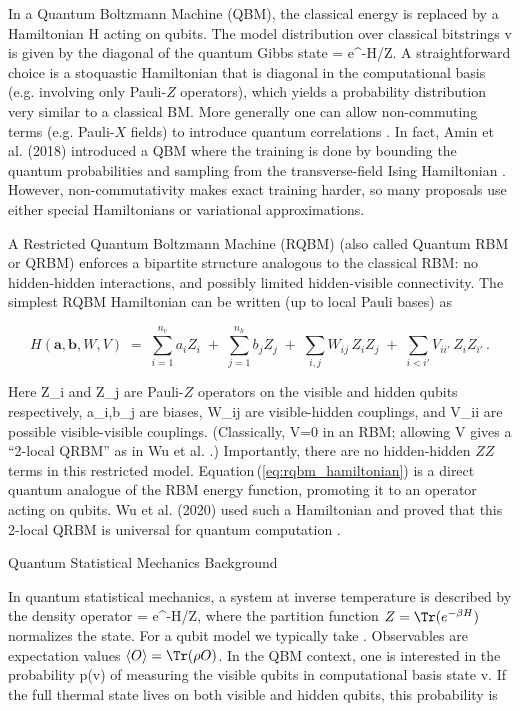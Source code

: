 In a Quantum Boltzmann Machine (QBM), the classical energy is replaced by a Hamiltonian H acting on qubits.  The model distribution over classical bitstrings v is given by the diagonal of the quantum Gibbs state \rho = e^{-H}/Z.  A straightforward choice is a stoquastic Hamiltonian that is diagonal in the computational basis (e.g. involving only Pauli-$Z$ operators), which yields a probability distribution very similar to a classical BM.  More generally one can allow non-commuting terms (e.g. Pauli-$X$ fields) to introduce quantum correlations .  In fact, Amin et al. (2018) introduced a QBM where the training is done by bounding the quantum probabilities and sampling from the transverse-field Ising Hamiltonian .  However, non-commutativity makes exact training harder, so many proposals use either special Hamiltonians or variational approximations.



A Restricted Quantum Boltzmann Machine (RQBM) (also called Quantum RBM or QRBM) enforces a bipartite structure analogous to the classical RBM: no hidden-hidden interactions, and possibly limited hidden-visible connectivity.  The simplest RQBM Hamiltonian can be written (up to local Pauli bases) as

\[

\label{eq:rqbm_hamiltonian}

H(\mathbf{a},\mathbf{b},W,V) \;=\; \sum_{i=1}^{n_v} a_i Z_i \;+\; \sum_{j=1}^{n_h} b_j Z_j \;+\; \sum_{i,j} W_{ij}\, Z_i Z_j \;+\; \sum_{i<i{\prime}} V_{ii{\prime}}\, Z_i Z_{i{\prime}} \,.

\]

Here Z_i and Z_j are Pauli-$Z$ operators on the visible and hidden qubits respectively, a_i,b_j are biases, W_{ij} are visible-hidden couplings, and V_{ii{\prime}} are possible visible-visible couplings.  (Classically, V=0 in an RBM; allowing V gives a “2-local QRBM” as in Wu et al. .)  Importantly, there are no hidden-hidden $ZZ$ terms in this restricted model.  Equation (\ref{eq:rqbm_hamiltonian}) is a direct quantum analogue of the RBM energy function, promoting it to an operator acting on qubits.  Wu et al. (2020) used such a Hamiltonian and proved that this 2-local QRBM is universal for quantum computation .





Quantum Statistical Mechanics Background





In quantum statistical mechanics, a system at inverse temperature \beta is described by the density operator \rho = e^{-\beta H}/Z, where the partition function \(Z = \Tr(e^{-\beta H})\) normalizes the state.  For a qubit model we typically take .  Observables are expectation values \(\langle O\rangle = \Tr(\rho O)\). In the QBM context, one is interested in the probability p(v) of measuring the visible qubits in computational basis state v.  If the full thermal state lives on both visible and hidden qubits, this probability is

